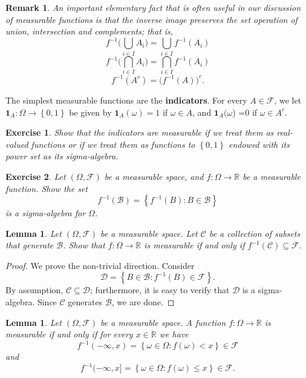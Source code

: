 \documentclass[12pt, reqno]{amsart}
\newtheorem{lemma}[theorem]{Lemma}
\newtheorem{remark}{Remark}
\newtheorem{ex}{Exercise}[section]
\newcommand\dff[1]{\textbf{#1}}
\newcommand\ns[1]{ \left\{ {#1} \right\} }
\newcommand{\R}{{\mathbb R}}
\newcommand{\F}{{\mathcal F}}     %
\begin{document}
\begin{remark}
An important elementary fact that is often useful in our discussion of measurable functions is that the inverse image preserves the set operation of union, intersection and complements; that is,
$$ f^{-1} \big(  \bigcup_{i \in I} A_i \big) =   \bigcup_{i \in I} f^{-1}(A_i)$$
$$ f^{-1} \big(  \bigcap_{i \in I}A_i \big) =   \bigcap_{i \in I} f^{-1}(A_i)$$
$$ f^{-1}(A^c) = \big(  f^{-1}(A) \big)^c.$$

\end{remark}



The simplest measurable functions are the \dff{indicators}.  For every $A \in \F$, we let $\mathbf{1}_A: \Omega \to \ns{0,1}$ be given by  $\mathbf{1}_A(\omega) = 1$ if $\omega \in A$, and $\mathbf{1}_A(\omega$) =0 if $\omega \in A^c$.

\begin{ex}  Show that the indicators are measurable if we treat them as real-valued functions or if we treat them as functions to $\ns{0,1}$ endowed with its power set as its sigma-algebra.  

\end{ex}


\begin{ex}
Let $(\Omega, \F)$ be a measurable space, and $f:\Omega \to \R$ be a measurable function.  Show the set $$f^{-1}(\mathcal B)=\ns{f^{-1}(B):  B \in \mathcal B}$$ is a sigma-algebra for $\Omega$.
\end{ex}

\begin{lemma} 
\label{genC}
Let $(\Omega, \F)$ be a measurable space.    Let $\mathcal{C}$ be  a collection of subsets that generate $\mathcal{B}$.   Show that   $f: \Omega \to \R$ is measurable if and only if $f^{-1}(\mathcal{C}) \subseteq \mathcal{F}$.  
%
\end{lemma}

\begin{proof}
We prove the non-trivial direction.   Consider 
$$\mathcal{D} =   \ns{  B \in \mathcal{B}:   f^{-1}(B) \in \F} .$$
By assumption, $\mathcal{C} \subseteq \mathcal{D}$; furthermore, it is easy to verify that $\mathcal{D}$ is a sigma-algebra.  Since $\mathcal{C}$ generates $\mathcal{B}$, we are done.  
\end{proof}


\begin{lemma} 
\label{use}
 Let $(\Omega, \F)$ be a measurable space.  A function $f: \Omega \to \R$ is measurable if and only if for every $x \in \R$ we have 
$$ f^{-1}{(-\infty, x)} = \ns{\omega \in \Omega:  f(\omega) < x}  \in \F$$
and
$$ f^{-1}{(-\infty, x]} = \ns{\omega \in \Omega:  f(\omega) \leq x}  \in \F.$$


\end{lemma}
\end{document}
